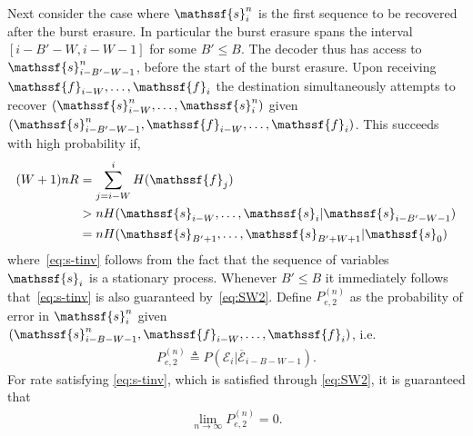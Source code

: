 \documentclass[journal, twocolumn, 10pt]{IEEEtran}
\newcommand{\rvf}{{\mathssf{f}}}    %
\newcommand{\rvs}{{\mathssf{s}}}    %
\begin{document}
Next consider the case where 
$\rvs_i^n$ is the first sequence to be recovered after the burst erasure. In particular the burst erasure spans the interval ${[ i-B'-W,i-W-1]}$ for some $B' \le B$. The decoder thus has access to $\rvs_{i-B'-W-1}^n$, before the start of the burst erasure. Upon receiving $\rvf_{i-W},\ldots, \rvf_i$ the destination simultaneously attempts to recover $(\rvs_{i-W}^n,\ldots, \rvs_i^n)$ given $(\rvs_{i-B'-W-1}^n, \rvf_{i-W},\ldots, \rvf_i)$. This succeeds with high probability if,
\begin{align}
(W+1)nR &= \sum_{j=i-W}^i H(\rvf_j) \\
&> nH(\rvs_{i-W},\ldots, \rvs_i|\rvs_{i-B'-W-1})\\
&=nH(\rvs_{B'+1},\ldots, \rvs_{B'+W+1}|\rvs_0)\label{eq:s-tinv}
\end{align}where~\eqref{eq:s-tinv} follows from the fact that the sequence of variables $\rvs_i$ is a stationary process. Whenever $B' \le B$ it immediately follows that~\eqref{eq:s-tinv}  is also guaranteed by~\eqref{eq:SW2}. Define $P^{(n)}_{e,2}$ as the probability of error in $\rvs^n_{i}$  given $(\rvs_{i-B-W-1}^n, \rvf_{i-W},\ldots, \rvf_i)$, i.e. 
\begin{align}
P_{e,2}^{(n)}\triangleq P(\mathcal{E}_{i} | \overline{\mathcal{E}}_{i-B-W-1}) \label{eq:eps2}.
\end{align}  For rate satisfying \eqref{eq:s-tinv}, which is satisfied through \eqref{eq:SW2}, it is guaranteed that  
\begin{align}
\lim_{n\to \infty} P^{(n)}_{e,2} = 0\label{eq:lim2}.
\end{align} 
\end{document}
